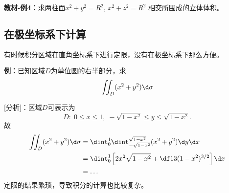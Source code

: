 {\bf 教材-例4：}求两柱面$x^2+y^2=R^2,\, x^2+z^2=R^2$
相交所围成的立体体积。

\begin{center}
\end{center}

\subsection{在极坐标系下计算}

有时候积分区域在直角坐标系下进行定限，没有在极坐标系下那么方便。

{\bf 例：}已知区域$D$为单位圆的右半部分，求
$$\iint_D(x^2+y^2)\d\sigma$$

[分析]：区域$D$可表示为
$$D:\;0\leq x\leq 1,\;-\sqrt{1-x^2}\leq y\leq\sqrt{1-x^2}.$$
故
\begin{align*}
	\iint_D(x^2+y^2)\d\sigma
	&=\dint_0^1\dint_{-\sqrt{1-x^2}}^{\sqrt{1-x^2}}(x^2+y^2)\d y\d x\\
	&=\dint_0^1\left[2x^2\sqrt{1-x^2}+\df13(1-x^2)^{3/2}\right]\d x\\
	&=\ldots
\end{align*}
定限的结果繁琐，导致积分的计算也比较复杂。

